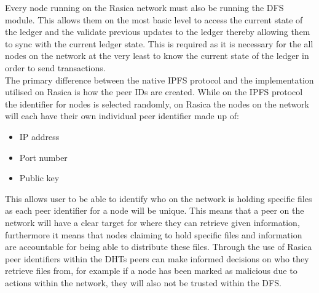 Every node running on the Rasica network must also be running the DFS module. This allows them on the most basic level to access the current state of the ledger and the validate previous updates to the ledger thereby allowing them to sync with the current ledger state. This is required as it is necessary for the all nodes on the network at the very least to know the current state of the ledger in order to send transactions. \\

The primary difference between the native IPFS protocol and the implementation utilised on Rasica is how the peer IDs are created.  While on the IPFS protocol the identifier for nodes is selected randomly, on Rasica the nodes on the network will each have their own individual peer identifier\cite{BytesExtentions} made up of:

\begin{itemize}
\item IP address
\item Port number
\item Public key
\end{itemize}


This allows user to be able to identify who on the network is holding specific files as each peer identifier for a node will be unique. This means that a peer on the network will have a clear target for where they can retrieve given information, furthermore it means that nodes claiming to hold specific files and information are accountable for being able to distribute these files. Through the use of Rasica peer identifiers within the DHTs peers can make informed decisions on who they retrieve files from, for example if a node has been marked as malicious due to actions within the network, they will also not be trusted within the DFS.

